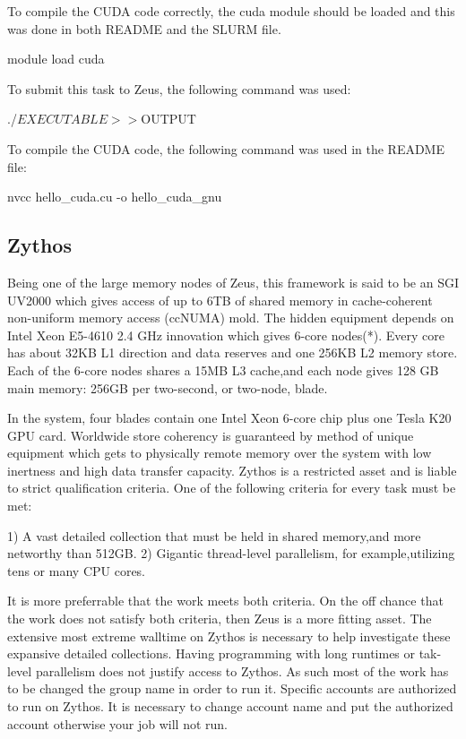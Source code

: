 \documentclass[journal]{IEEEtran}
\begin{document}
To compile the CUDA code correctly, the cuda module should be loaded and this was done in both README and the SLURM file.

module load cuda

To submit this task to Zeus, the following command was used:

./$EXECUTABLE >> ${OUTPUT}

To compile the CUDA code, the following command was used in the README file:

nvcc hello_cuda.cu -o hello_cuda_gnu
 
  
\subsection{Zythos}

Being one of the large memory nodes of Zeus, this framework is said to be an SGI UV2000 which gives access of up to 6TB of shared memory in cache-coherent non-uniform memory access (ccNUMA) mold.
The hidden equipment depends on Intel Xeon E5-4610 2.4 GHz innovation which gives 6-core nodes(*). 
Every core has about 32KB L1 direction and data reserves and one 256KB L2 memory store. 
Each of the 6-core nodes shares a 15MB L3 cache,and each node gives 128 GB main memory: 256GB per two-second, or two-node, blade.

In the system, four blades contain one Intel Xeon 6-core chip plus one Tesla K20 GPU card.
Worldwide store coherency is guaranteed by method of unique equipment which gets to physically remote memory over the system with low inertness and high data transfer capacity.
Zythos is a restricted asset and is liable to strict qualification criteria. 
One of the following criteria for every task must be met:

1) A vast detailed collection that must be held in shared memory,and more networthy than 512GB.
2) Gigantic thread-level parallelism, for example,utilizing tens or many CPU cores.

It is more preferrable that the work meets both criteria. 
On the off chance that the work does not satisfy both criteria, then Zeus is a more fitting asset.
The extensive most extreme walltime on Zythos is necessary to help investigate these expansive detailed collections.
Having programming with long runtimes or tak-level parallelism does not justify access to Zythos.
As such most of the work has to be changed the group name in order to run it. 
Specific accounts are authorized to run on Zythos. It is necessary to change account name and put the authorized account otherwise your job will not run.
\end{document}
